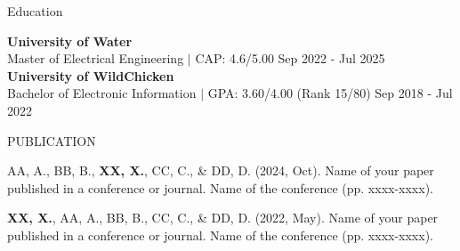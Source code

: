 \documentclass{resume} %
\begin{document}

\begin{rSection}{Education}

{\bf University of Water} \\
Master of Electrical Engineering $\mid$ CAP: 4.6/5.00 \hfill {Sep 2022 - Jul 2025} \\

{\bf University of WildChicken} \\
Bachelor of Electronic Information $\mid$ GPA: 3.60/4.00 (Rank 15/80) \hfill {Sep 2018 - Jul 2022}  

\end{rSection}

\begin{rSection}{PUBLICATION}
\vspace{-1.25em}
\item AA, A., BB, B., \textbf{XX, X.}, CC, C., \& DD, D. (2024, Oct). Name of your paper published in a conference or journal. Name of the conference (pp. xxxx-xxxx).
\item \textbf{XX, X.}, AA, A., BB, B., CC, C., \& DD, D. (2022, May). Name of your paper published in a conference or journal. Name of the conference (pp. xxxx-xxxx).
\end{rSection}
\end{document}

